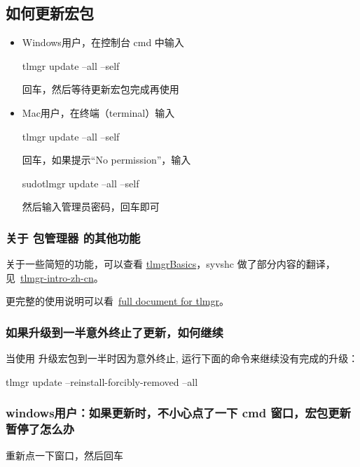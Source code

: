 
\subsection{如何更新宏包}

\begin{itemize}
  \item Windows用户，在控制台 cmd 中输入
  
  \begin{shellexample}[gobble = 4]
    tlmgr update --all --self
  \end{shellexample}
  
  回车，然后等待更新宏包完成再使用
  
  \item Mac用户，在终端（terminal）输入
  
  \begin{shellexample}[gobble = 4]
    tlmgr update --all --self
  \end{shellexample}
  
  回车，如果提示``No permission''，输入
  
  \begin{shellexample}[gobble = 4]
    sudotlmgr update --all --self
  \end{shellexample}
  
  然后输入管理员密码，回车即可
\end{itemize}


\subsubsection{关于 \TeXLive 包管理器  的其他功能}

关于一些简短的功能，可以查看 \href{http://mirrors.ctan.org/info/tlmgrbasics/doc/tlmgr.pdf}{tlmgrBasics}，syvshc 做了部分内容的翻译，见~\href{http://mirrors.ctan.org/info/tlmgr-intro-zh-cn/tlmgr-intro-zh-cn.pdf}{tlmgr-intro-zh-cn}。

更完整的使用说明可以看~\href{https://www.tug.org/texlive/doc/tlmgr.html}{full document for tlmgr}。


\subsubsection{如果升级到一半意外终止了更新，如何继续}

当使用  升级宏包到一半时因为意外终止, 运行下面的命令来继续没有完成的升级：

\begin{shellexample}
  tlmgr update –reinstall-forcibly-removed –all
\end{shellexample}


\subsubsection{windows用户：如果更新时，不小心点了一下 cmd 窗口，宏包更新暂停了怎么办}

重新点一下窗口，然后回车